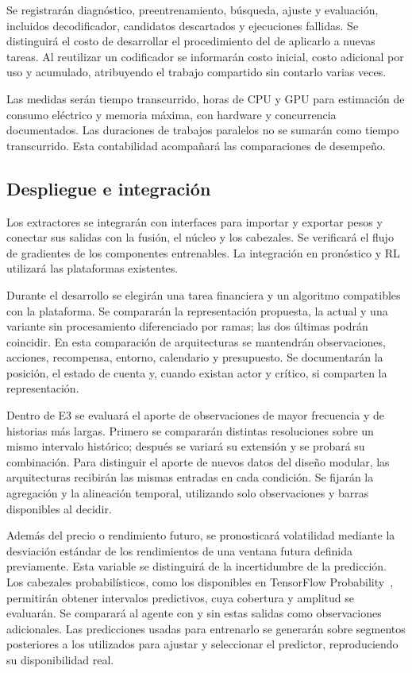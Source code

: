 \documentclass[11pt,letterpaper]{article}
\begin{document}
Se registrarán diagnóstico, preentrenamiento, búsqueda, ajuste y evaluación, incluidos decodificador, candidatos descartados y ejecuciones fallidas. Se distinguirá el costo de desarrollar el procedimiento del de aplicarlo a nuevas tareas. Al reutilizar un codificador se informarán costo inicial, costo adicional por uso y acumulado, atribuyendo el trabajo compartido sin contarlo varias veces.

Las medidas serán tiempo transcurrido, horas de CPU y GPU para estimación de consumo eléctrico y memoria máxima, con hardware y concurrencia documentados. Las duraciones de trabajos paralelos no se sumarán como tiempo transcurrido. Esta contabilidad acompañará las comparaciones de desempeño.

\subsection{Despliegue e integración}

Los extractores se integrarán con interfaces para importar y exportar pesos y conectar sus salidas con la fusión, el núcleo y los cabezales. Se verificará el flujo de gradientes de los componentes entrenables. La integración en pronóstico y RL utilizará las plataformas existentes.

Durante el desarrollo se elegirán una tarea financiera y un algoritmo compatibles con la plataforma. Se compararán la representación propuesta, la actual y una variante sin procesamiento diferenciado por ramas; las dos últimas podrán coincidir. En esta comparación de arquitecturas se mantendrán observaciones, acciones, recompensa, entorno, calendario y presupuesto. Se documentarán la posición, el estado de cuenta y, cuando existan actor y crítico, si comparten la representación.

Dentro de E3 se evaluará el aporte de observaciones de mayor frecuencia y de historias más largas. Primero se compararán distintas resoluciones sobre un mismo intervalo histórico; después se variará su extensión y se probará su combinación. Para distinguir el aporte de nuevos datos del diseño modular, las arquitecturas recibirán las mismas entradas en cada condición. Se fijarán la agregación y la alineación temporal, utilizando solo observaciones y barras disponibles al decidir.

Además del precio o rendimiento futuro, se pronosticará volatilidad mediante la desviación estándar de los rendimientos de una ventana futura definida previamente. Esta variable se distinguirá de la incertidumbre de la predicción. Los cabezales probabilísticos, como los disponibles en TensorFlow Probability~\cite{tfp2024regression}, permitirán obtener intervalos predictivos, cuya cobertura y amplitud se evaluarán. Se comparará al agente con y sin estas salidas como observaciones adicionales. Las predicciones usadas para entrenarlo se generarán sobre segmentos posteriores a los utilizados para ajustar y seleccionar el predictor, reproduciendo su disponibilidad real.
\end{document}
